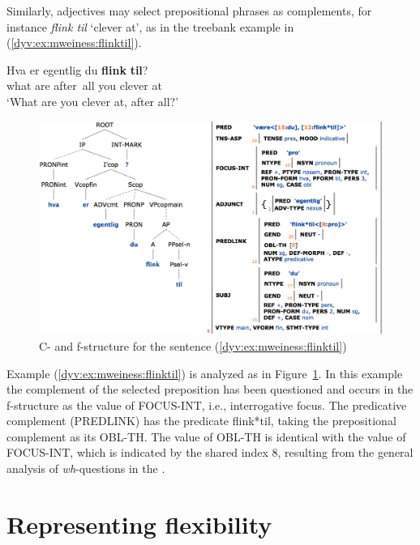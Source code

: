 \documentclass[output=paper]{langsci/langscibook}
\begin{document}
Similarly, adjectives may select prepositional phrases as complements, for instance \textit{flink til} `clever at', as in the treebank example in (\ref{dyv:ex:mweiness:flinktil}).

\ea\label{dyv:ex:mweiness:flinktil}
\gll Hva er egentlig du \textbf{flink} \textbf{til}? \\
     what are after all you clever at\\
\glt `What are you clever at, after all?'
\z

\begin{figure}
  \includegraphics[width=\textwidth]{figures/flinktil-c-f.png}
  \caption{C- and f-structure for the sentence  (\ref{dyv:ex:mweiness:flinktil}) }
  \label{dyv:fig:mweiness:flinktil-c-f}
\end{figure}

Example  (\ref{dyv:ex:mweiness:flinktil}) is analyzed as in Figure~\ref{dyv:fig:mweiness:flinktil-c-f}.
In this example the complement of the selected preposition has been questioned and occurs in the f-structure as the value of \textsf{FOCUS-INT}, i.e., interrogative focus.
The predicative complement (\textsf{PREDLINK}) has the predicate \textsf{flink*til}, taking the prepositional complement as its \textsf{OBL-TH}.
The value of \textsf{OBL-TH} is identical with the value of  \textsf{FOCUS-INT}, which is indicated by the shared index \textsf{8}, resulting from the general analysis of \textit{wh}-questions in the .

\section{Representing flexibility}\label{dyv:sec:mweiness:variation}
\end{document}
